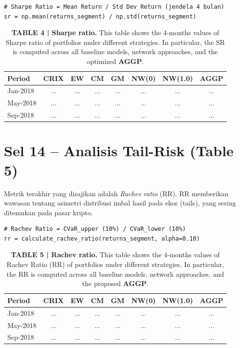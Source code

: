 \documentclass[12pt,a4paper]{article}
\begin{document}
\begin{lstlisting}[caption={Kalkulasi Sharpe Ratio Periodik}]
# Sharpe Ratio = Mean Return / Std Dev Return (jendela 4 bulan)
sr = np.mean(returns_segment) / np.std(returns_segment)
\end{lstlisting}

\begin{table}[h]
    \centering
    \footnotesize
    \caption{\textbf{TABLE 4 | Sharpe ratio.} This table shows the 4-months values of Sharpe ratio of portfolios under different strategies. In particular, the SR is computed across all baseline models, network approaches, and the optimized \textbf{AGGP}.}
    \begin{tabular}{lccccccc}
        \toprule
        Period & CRIX & EW & CM & GM & NW(0) & NW(1.0) & AGGP \\
        \midrule
        Jan-2018 & ... & ... & ... & ... & ... & ... & ... \\
        May-2018 & ... & ... & ... & ... & ... & ... & ... \\
        Sep-2018 & ... & ... & ... & ... & ... & ... & ... \\
        \bottomrule
    \end{tabular}
\end{table}

\section{Sel 14 -- Analisis Tail-Risk (Table 5)}
Metrik terakhir yang disajikan adalah \textit{Rachev ratio} (RR). RR memberikan wawasan tentang asimetri distribusi imbal hasil pada ekor (tails), yang sering ditemukan pada pasar kripto.

\begin{lstlisting}[caption={Kalkulasi Rachev Ratio Periodik}]
# Rachev Ratio = CVaR_upper (10%) / CVaR_lower (10%)
rr = calculate_rachev_ratio(returns_segment, alpha=0.10)
\end{lstlisting}

\begin{table}[h]
    \centering
    \footnotesize
    \caption{\textbf{TABLE 5 | Rachev ratio.} This table shows the 4-months values of Rachev Ratio (RR) of portfolios under different strategies. In particular, the RR is computed across all baseline models, network approaches, and the proposed \textbf{AGGP}.}
    \begin{tabular}{lccccccc}
        \toprule
        Period & CRIX & EW & CM & GM & NW(0) & NW(1.0) & AGGP \\
        \midrule
        Jan-2018 & ... & ... & ... & ... & ... & ... & ... \\
        May-2018 & ... & ... & ... & ... & ... & ... & ... \\
        Sep-2018 & ... & ... & ... & ... & ... & ... & ... \\
        \bottomrule
    \end{tabular}
\end{table}
\end{document}
